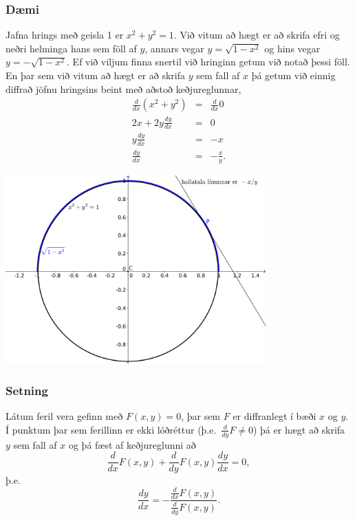 \documentclass[icelandic,a4paper,12pt]{article}
\begin{document}
\subsubsection{Dæmi}
  Jafna hrings með geisla 1 er $x^2+y^2=1$. Við vitum að hægt er
að skrifa efri og neðri helminga hans sem föll af $y$, annars
vegar $y=\sqrt{1-x^2}$ og hins vegar $y=-\sqrt{1-x^2}$.
\pause
Ef við viljum finna snertil við hringinn getum við notað þessi föll. 
\pause
En þar sem við vitum að hægt er að skrifa $y$ sem fall af $x$ þá
getum við einnig diffrað jöfnu hringsins beint með aðstoð keðjureglunnar,
\begin{eqnarray*}
\frac{d}{dx}(x^2+y^2) &=& \frac{d}{dx} 0 \\
 	2x + 2y\frac{dy}{dx} &=& 0\\
	y\frac{dy}{dx} &=& -x\\
	\frac{dy}{dx} &=& -\frac xy.
\end{eqnarray*}
\begin{center}
\includegraphics[width=10cm,keepaspectratio=true]{./myndir/IB11-f08_hringur-eps-converted-to.pdf}
\end{center}

\subsubsection{Setning}
Látum feril vera gefinn með $F(x,y) =0$, þar sem $F$ er diffranlegt
í bæði $x$ og $y$. Í punktum þar sem ferillinn er ekki lóðréttur
(þ.e.~$\frac{d}{dy}F \neq 0$) þá er hægt að skrifa $y$ sem fall af 
$x$ og þá fæst af keðjureglunni að 
\begin{equation*}
 \frac{d}{dx} F(x,y) + \frac{d}{dy}F(x,y) \frac{dy}{dx} = 0,
\end{equation*}
þ.e.
\begin{equation*}
\frac{dy}{dx} = -\frac{\frac{d}{dx} F(x,y)}{\frac{d}{dy} F(x,y)}.
\end{equation*}
\end{document}
